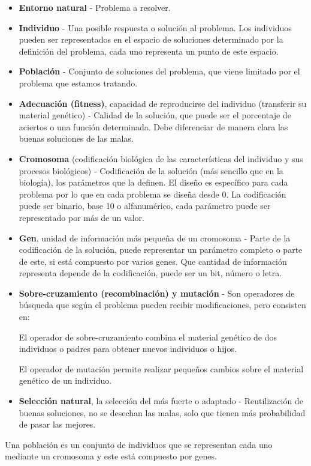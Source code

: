 \documentclass[12pt, twoside, openright]{report} %
\begin{document}
\begin{itemize}
	\item \textbf{Entorno natural} - Problema a resolver.
	\item \textbf{Individuo} - Una posible respuesta o solución al problema. Los individuos pueden ser representados en el espacio de soluciones determinado por la definición del problema, cada uno representa un punto de este espacio.
	\item \textbf{Población} - Conjunto de soluciones del problema, que viene limitado por el problema que estamos tratando.
	\item \textbf{Adecuación (fitness)}, capacidad de reproducirse del individuo (transferir su material genético) - Calidad de la solución, que puede ser el porcentaje de aciertos o una función determinada. Debe diferenciar de manera clara las buenas soluciones de las malas.
	\item \textbf{Cromosoma} (codificación biológica de las características del individuo y sus procesos biológicos) - Codificación de la solución (más sencillo que en la biología), los parámetros que la definen. El diseño es específico para cada problema por lo que en cada problema se diseña desde 0. La codificación puede ser binario, base 10 o alfanumérico, cada parámetro puede ser representado por más de un valor.
	\item \textbf{Gen}, unidad de información más pequeña de un cromosoma - Parte de la codificación de la solución, puede representar un parámetro completo o parte de este, si está compuesto por varios genes. Que cantidad de información representa depende de la codificación, puede ser un bit, número o letra.
	\item \textbf{Sobre-cruzamiento (recombinación) y mutación} - Son operadores de búsqueda que según el problema pueden recibir modificaciones, pero consisten en:

	      El operador de sobre-cruzamiento combina el material genético de dos individuos o padres para obtener nuevos individuos o hijos.

	      El operador de mutación permite realizar pequeños cambios sobre el material genético de un individuo.
	\item \textbf{Selección natural}, la selección del más fuerte o adaptado - Reutilización de buenas soluciones, no se desechan las malas, solo que tienen más probabilidad de pasar las mejores.
\end{itemize}

Una población es un conjunto de individuos que se representan cada uno mediante un cromosoma y este está compuesto por genes.
\end{document}
